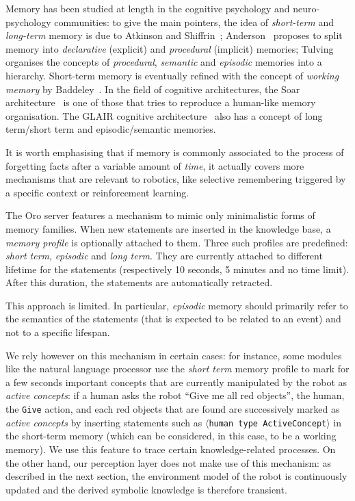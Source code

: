 \documentclass[preprint,3p,times]{elsarticle}
\newcommand{\concept}[1]{{\small \texttt{#1}}}
\newcommand{\stmt}[1]{{\footnotesize\tt$\langle$#1\relax$\rangle$}}
\begin{document}
Memory has been studied at length in the cognitive psychology and
neuro-psychology communities: to give the main pointers, the idea of \emph{short-term} and
\emph{long-term} memory is due to Atkinson and Shiffrin~\cite{Atkinson1968};
Anderson~\cite{Anderson1976} proposes to split memory into \emph{declarative} (explicit)
and \emph{procedural} (implicit) memories; Tulving~\cite{Tulving1985} organises
the concepts of \emph{procedural}, \emph{semantic} and \emph{episodic} memories
into a hierarchy. Short-term memory is eventually refined with the concept of
\emph{working memory} by Baddeley~\cite{Baddeley2010}.
In the field of cognitive architectures, the {\sc Soar}
architecture~\cite{Lehman2006} is one of those that tries to reproduce a
human-like memory organisation. The GLAIR cognitive
architecture~\cite{Shapiro2009} also has a concept of long term/short term and
episodic/semantic memories.

It is worth emphasising that if memory is commonly associated to the process of
forgetting facts after a variable amount of \emph{time}, it actually covers
more mechanisms that are relevant to robotics, like selective remembering
triggered by a specific context or reinforcement learning.

The {\sc Oro} server features a mechanism to mimic only minimalistic forms of memory
families.  When new statements are inserted in the knowledge base, a
\emph{memory profile} is optionally attached to them.  Three such profiles are
predefined: {\it short term}, {\it episodic} and {\it long term}. They are
currently attached to different lifetime for the statements (respectively 10
seconds, 5 minutes and no time limit). After this duration, the statements are
automatically retracted.

This approach is limited. In particular, \emph{episodic} memory should primarily
refer to the semantics of the statements (that is expected to be related to an
event) and not to a specific lifespan.

We rely however on this mechanism in certain cases: for instance, some modules
like the natural language processor use the {\it short term} memory profile to
mark for a few seconds important concepts that are currently manipulated by the
robot as \emph{active concepts}: if a human asks the robot ``Give
me all red objects'', the human, the \concept{Give} action, and each red
objects that are found are successively marked as \emph{active concepts} by
inserting statements such as \stmt{human type ActiveConcept} in the short-term
memory (which can be considered, in this case, to be a working memory). We use
this feature to trace certain knowledge-related processes. On the other hand,
our perception layer does not make use of this mechanism: as described in the
next section, the environment model of the robot is continuously updated and the
derived symbolic knowledge is therefore transient.
\end{document}
